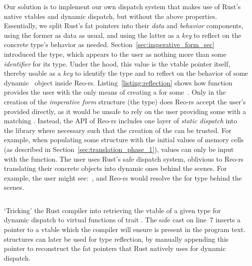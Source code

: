 Our solution is to implement our own dispatch system that makes use of Rust's native vtables and dynamic dispatch, but without the above properties. Essentially, we split Rust's fat pointers into their \textit{data} and \textit{behavior} components, using the former as data as usual, and using the latter as a \textit{key} to reflect on the concrete type's behavior as needed. Section~\ref{sec:imperative_form_sec} introduced the  type, which appears to the user as nothing more than some \textit{identifier} for its type. Under the hood, this value is the vtable pointer itself, thereby usable as a \textit{key} to identify the type and to reflect on the behavior of some dynamic~ object inside Reo-rs. Listing~\ref{listing:reflection} shows how function  provides the user with the only means of creating a  for some~. Only in the creation of the \textit{imperative form} structure (the  type) does Reo-rs accept the user's provided  directly, as it would be unsafe to rely on the user providing some  with a matching . Instead, the API of Reo-rs includes one layer of \textit{static dispatch} into the library where necessary such that the creation of the  can be trusted. For example, when populating some  structure with the initial values of memory cells (as described in Section~\ref{sec:translation_phase_1}), values can only be input with the  function. The user uses Rust's safe dispatch system, oblivious to Reo-rs translating their concrete objects into dynamic ones behind the scenes. For example, the user might see:~, and Reo-rs would resolve the  for  type behind the scenes.


\begin{listing}[ht]
	\centering
	\inputminted{rust}{reflection.rs}
	\caption[Tricking Rust into exposing a vtable.]{`Tricking' the Rust compiler into retrieving the vtable of a given type  for dynamic dispatch to virtual functions of trait . The safe cast on line~7 inserts a pointer to a vtable which the compiler will ensure is present in the program text.  structures can later be used for type reflection, by manually appending this pointer to reconstruct the fat pointers that Rust natively uses for dynamic dispatch.}
	\label{listing:reflection}
\end{listing}


